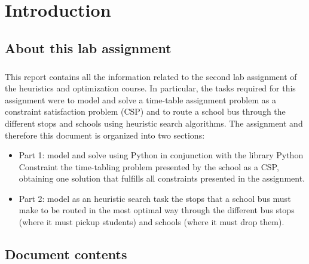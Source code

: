 \chapter{Introduction}
\label{chapter: introduction}

\section{About this lab assignment}

\paragraph{}
This report contains all the information related to the second lab assignment of the heuristics and optimization course. In particular, the tasks required for this assignment were to model and solve a time-table assignment problem as a constraint satisfaction problem (CSP) and to route a school bus through the different stops and schools using heuristic search algorithms. The assignment and therefore this document is organized into two sections:
\begin{itemize}
    \item[] Part 1: model and solve using Python in conjunction with the library Python Constraint the time-tabling problem presented by the school as a CSP, obtaining one solution that fulfills all constraints presented in the assignment. 
    
    \item[] Part 2: model as an heuristic search task the stops that a school bus must make to be routed in the most optimal way through the different bus stops (where it must pickup students) and schools (where it must drop them). 
    
\end{itemize}

\section{Document contents}
